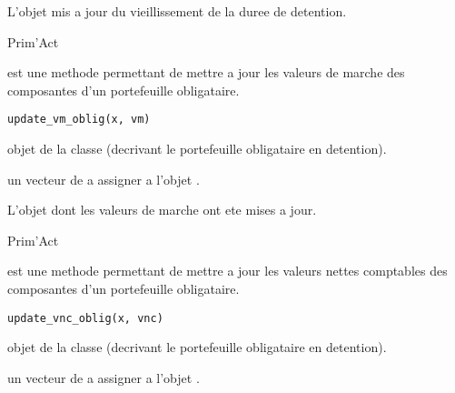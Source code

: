 \documentclass[a4paper]{book}
\begin{document}
%
\begin{Value}
L'objet  mis a jour du vieillissement de la duree de detention.
\end{Value}
%
\begin{Author}\relax
Prim'Act
\end{Author}
%
\begin{Description}\relax
{} est une methode permettant de mettre a jour les valeurs de marche des composantes d'un portefeuille obligataire.
\end{Description}
%
\begin{Usage}
\begin{verbatim}
update_vm_oblig(x, vm)
\end{verbatim}
\end{Usage}
%
\begin{Arguments}
\begin{ldescription}
\item[\code{x}] objet de la classe  (decrivant le portefeuille obligataire en detention).

\item[\code{vm}] un vecteur de  a assigner a l'objet .
\end{ldescription}
\end{Arguments}
%
\begin{Value}
L'objet  dont les valeurs de marche ont ete mises a jour.
\end{Value}
%
\begin{Author}\relax
Prim'Act
\end{Author}
%
\begin{Description}\relax
{} est une methode permettant de mettre a jour les valeurs nettes comptables des composantes d'un portefeuille obligataire.
\end{Description}
%
\begin{Usage}
\begin{verbatim}
update_vnc_oblig(x, vnc)
\end{verbatim}
\end{Usage}
%
\begin{Arguments}
\begin{ldescription}
\item[\code{x}] objet de la classe  (decrivant le portefeuille obligataire en detention).

\item[\code{vnc}] un vecteur de  a assigner a l'objet .
\end{ldescription}
\end{Arguments}
\end{document}
